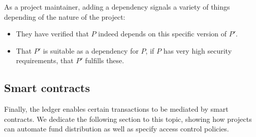 As a project maintainer, adding a dependency signals a variety of things
depending of the nature of the project:
\begin{itemize}
\item They have verified that $P$ indeed depends on this specific
  version of $P'$.
\item That $P'$ is suitable as a dependency for $P$, \eg{} if $P$ has
  very high security requirements, that $P'$ fulfills these.
\end{itemize}

\subsection{Smart contracts}

Finally, the ledger enables certain transactions to be mediated by smart contracts.
We dedicate the following section to this topic, showing how projects can automate
fund distribution as well as specify access control policies.

